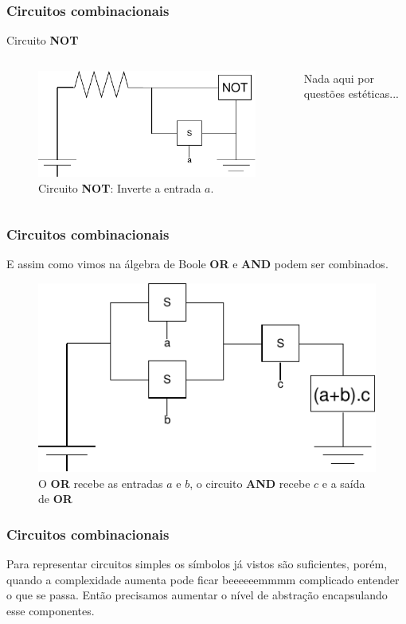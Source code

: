 \begin{frame}
	\frametitle{Circuitos combinacionais}
	\par Circuito \textbf{NOT}
	\begin{columns}
		\begin{figure}
			\centering
			\includegraphics[width=0.7\linewidth]{images/circuitoNot}
			\caption{Circuito \textbf{NOT}: Inverte a entrada $a$.}
			\label{fig:portanao}
		\end{figure}
		
		\par Nada aqui por questões estéticas...
	\end{columns}
\end{frame}

\begin{frame}
	\frametitle{Circuitos combinacionais}
	\par E assim como vimos na álgebra de Boole \textbf{OR} e \textbf{AND} podem ser combinados.
	\begin{figure}
		\centering
		\includegraphics[width=0.7\linewidth]{images/aMaisBVezesC}
		\caption{O \textbf{OR} recebe as entradas $a$ e $b$, o circuito \textbf{AND} recebe $c$ e a saída de \textbf{OR}}
		\label{fig:amaisbvezesc}
	\end{figure}
\end{frame}

\begin{frame}
	\frametitle{Circuitos combinacionais}
	\par Para representar circuitos simples os símbolos já vistos são suficientes, porém, quando a complexidade aumenta pode ficar beeeeeemmmm complicado entender o que se passa. Então precisamos aumentar o nível de abstração encapsulando esse componentes.
\end{frame}

